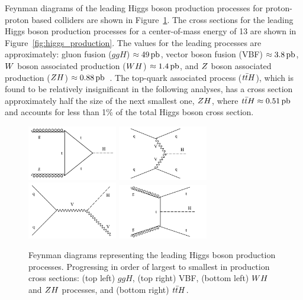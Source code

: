 Feynman diagrams of the leading Higgs boson production processes for
proton-proton based colliders are shown in Figure~\ref{fig:higgs_feyn}. 
The cross sections for the leading Higgs boson production processes for a 
center-of-mass energy of 13\TeV
are shown in Figure~\ref{fig:higgs_production}. The values for the leading
processes are approximately: gluon fusion ($ggH$) $\approx 49\,\mathrm{pb}$, 
vector boson fusion (VBF) $\approx 3.8\,\mathrm{pb}$, $W$ boson associated production ($WH$) $\approx 1.4\,\mathrm{pb}$,
and $Z$ boson associated production ($ZH$) $\approx 0.88\,\mathrm{pb}$~\cite{deFlorian:2016spz}. 
The top-quark associated process ($t\bar{t}H$),
which is found to be relatively insignificant in the following analyses, has a cross
section approximately half the size of the next smallest one, $ZH$, where
$t\bar{t}H \approx 0.51\,\mathrm{pb}$ and accounts for less than 1\% of the total Higgs boson
cross section.


\begin{figure}[htbp]
\centering
     \includegraphics[width=0.35\textwidth]{phenomenology_of_processes/plots/feyn_ggH.pdf}
     \includegraphics[width=0.35\textwidth]{phenomenology_of_processes/plots/feyn_qqH.pdf}
     \includegraphics[width=0.35\textwidth]{phenomenology_of_processes/plots/feyn_VH.pdf}
     \includegraphics[width=0.35\textwidth]{phenomenology_of_processes/plots/feyn_ttH.pdf}
     \caption{
Feynman diagrams representing the leading Higgs boson production processes.
Progressing in order of largest to smallest in production cross sections:
(top left) $ggH$, (top right) VBF, (bottom left)
$WH$ and $ZH$ processes,
and (bottom right) $t\bar{t}H$.
     }
     \label{fig:higgs_feyn}
\end{figure}


